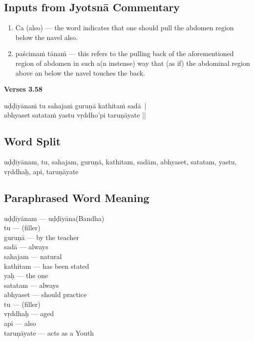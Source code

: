\subsection*{Inputs from Jyotsnā Commentary}

\begin{enumerate}
\item Ca (also) --- the word indicates that one should pull the abdomen region below the navel also.
\item paścimaṁ tānaṁ --- this refers to the pulling back of the aforementioned region of abdomen in such a(n instense) way that (as if) the abdominal region above an below the navel touches the back. 
\end{enumerate}


\noindent \textbf{Verses 3.58}

\begin{shloka}
uḍḍīyānaṁ tu sahajaṁ guruṇā kathitaṁ sadā |\\ 
abhyaset satataṁ yastu vṛddho'pi taruṇāyate ||
\end{shloka}

\subsection*{Word Split}

uḍḍīyānam, tu, sahajam, guruṇā, kathitam, sadām, abhyaset, satatam, yastu, vṛddhaḥ, api, taruṇāyate

\subsection*{Paraphrased Word Meaning}

\begin{multicols}{2}
uḍḍīyānam --- uḍḍīyāna(Bandha)\\
tu --- (filler) \\
guruṇā --- by the teacher \\
sadā --- always \\
sahajam --- natural \\
kathitam --- has been stated \\
yaḥ --- the one \\
satatam --- always \\
abhyaset ---  should practice \\
tu --- (filler)\\
vṛddhaḥ --- aged  \\
api --- also \\
taruṇāyate --- acts as a Youth 
\end{multicols}

